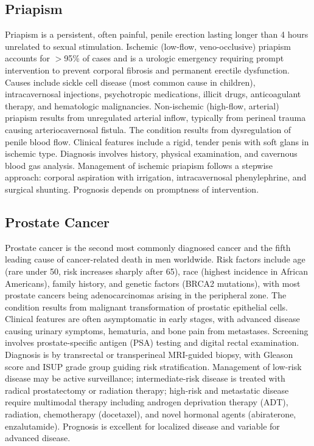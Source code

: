 \subsection{Priapism}
\label{sec:Priapism}
Priapism is a persistent, often painful, penile erection lasting longer than 4 hours unrelated to sexual stimulation. Ischemic (low-flow, veno-occlusive) priapism accounts for $>$95\% of cases and is a urologic emergency requiring prompt intervention to prevent corporal fibrosis and permanent erectile dysfunction. Causes include sickle cell disease (most common cause in children), intracavernosal injections, psychotropic medications, illicit drugs, anticoagulant therapy, and hematologic malignancies. Non-ischemic (high-flow, arterial) priapism results from unregulated arterial inflow, typically from perineal trauma causing arteriocavernosal fistula. The condition results from dysregulation of penile blood flow. Clinical features include a rigid, tender penis with soft glans in ischemic type. Diagnosis involves history, physical examination, and cavernous blood gas analysis. Management of ischemic priapism follows a stepwise approach: corporal aspiration with irrigation, intracavernosal phenylephrine, and surgical shunting. Prognosis depends on promptness of intervention.

\subsection{Prostate Cancer}
\label{sec:Prostate Cancer}
Prostate cancer is the second most commonly diagnosed cancer and the fifth leading cause of cancer-related death in men worldwide. Risk factors include age (rare under 50, risk increases sharply after 65), race (highest incidence in African Americans), family history, and genetic factors (BRCA2 mutations), with most prostate cancers being adenocarcinomas arising in the peripheral zone. The condition results from malignant transformation of prostatic epithelial cells. Clinical features are often asymptomatic in early stages, with advanced disease causing urinary symptoms, hematuria, and bone pain from metastases. Screening involves prostate-specific antigen (PSA) testing and digital rectal examination. Diagnosis is by transrectal or transperineal MRI-guided biopsy, with Gleason score and ISUP grade group guiding risk stratification. Management of low-risk disease may be active surveillance; intermediate-risk disease is treated with radical prostatectomy or radiation therapy; high-risk and metastatic disease require multimodal therapy including androgen deprivation therapy (ADT), radiation, chemotherapy (docetaxel), and novel hormonal agents (abiraterone, enzalutamide). Prognosis is excellent for localized disease and variable for advanced disease.

